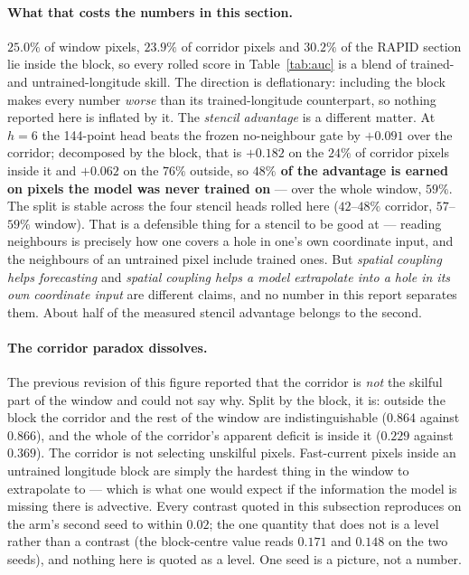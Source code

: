 \documentclass[10pt]{article}
\begin{document}
\paragraph{What that costs the numbers in this section.} $25.0\%$ of
window pixels, $23.9\%$ of corridor pixels and $30.2\%$ of the RAPID
section lie inside the block, so every rolled score in
Table~\ref{tab:auc} is a blend of trained- and untrained-longitude
skill. The direction is deflationary: including the block makes every
number \emph{worse} than its trained-longitude counterpart, so nothing
reported here is inflated by it. The \emph{stencil advantage} is a
different matter. At $h{=}6$ the 144-point head beats the frozen
no-neighbour gate by $+0.091$ over the corridor; decomposed by the
block, that is $+0.182$ on the $24\%$ of corridor pixels inside it and
$+0.062$ on the $76\%$ outside, so \textbf{$48\%$ of the advantage is
earned on pixels the model was never trained on} --- over the whole
window, $59\%$. The split is stable across the four stencil heads rolled
here ($42$--$48\%$ corridor, $57$--$59\%$ window). That is a defensible
thing for a stencil to be good at --- reading neighbours is precisely
how one covers a hole in one's own coordinate input, and the neighbours
of an untrained pixel include trained ones. But \emph{spatial coupling
helps forecasting} and \emph{spatial coupling helps a model extrapolate
into a hole in its own coordinate input} are different claims, and no
number in this report separates them. About half of the measured stencil
advantage belongs to the second.

\paragraph{The corridor paradox dissolves.} The previous revision of
this figure reported that the corridor is \emph{not} the skilful part of
the window and could not say why. Split by the block, it is: outside the
block the corridor and the rest of the window are indistinguishable
($0.864$ against $0.866$), and the whole of the corridor's apparent
deficit is inside it ($0.229$ against $0.369$). The corridor is not
selecting unskilful pixels. Fast-current pixels inside an untrained
longitude block are simply the hardest thing in the window to
extrapolate to --- which is what one would expect if the information the
model is missing there is advective. Every contrast quoted in this
subsection reproduces on the arm's second seed to within $0.02$;
the one quantity that does not is a level rather than a contrast (the
block-centre value reads $0.171$ and $0.148$ on the two seeds), and
nothing here is quoted as a level. One seed is a picture, not a number.
\end{document}
